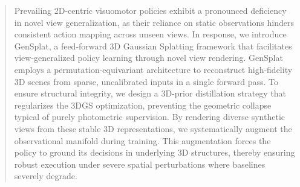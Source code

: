 \begin{abstract}




Prevailing 2D-centric visuomotor policies exhibit a pronounced deficiency in novel view generalization, as their reliance on static observations hinders consistent action mapping across unseen views. In response, we introduce GenSplat, a feed-forward 3D Gaussian Splatting framework that facilitates view-generalized policy learning through novel view rendering. GenSplat employs a permutation-equivariant architecture to reconstruct high-fidelity 3D scenes from sparse, uncalibrated inputs in a single forward pass. To ensure structural integrity, we design a 3D-prior distillation strategy that regularizes the 3DGS optimization, preventing the geometric collapse typical of purely photometric supervision. By rendering diverse synthetic views from these stable 3D representations, we systematically augment the observational manifold during training. This augmentation forces the policy to ground its decisions in underlying 3D structures, thereby ensuring robust execution under severe spatial perturbations where baselines severely degrade.



\end{abstract}